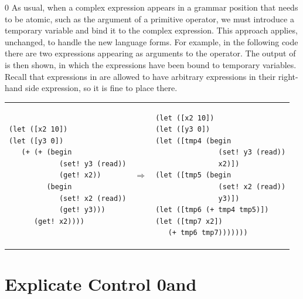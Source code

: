 \documentclass[7x10]{TimesAPriori_MIT}%
\def\racketEd{0}
\providecommand{\BookEdition}{1}
\let\edition\BookEdition
\newcommand{\racket}[1]{{\if\edition\racketEd{#1}\fi}}
\numberwithin{theorem}{chapter}
\numberwithin{definition}{chapter}
\numberwithin{equation}{chapter}
\begin{document}
{\if\edition\racketEd    
%
As usual, when a complex expression appears in a grammar position that
needs to be atomic, such as the argument of a primitive operator, we
must introduce a temporary variable and bind it to the complex
expression.  This approach applies, unchanged, to handle the new
language forms.  For example, in the following code there are two
 expressions appearing as arguments to the \code{+}
operator.  The output of  is then shown, in which the
 expressions have been bound to temporary
variables. Recall that  expressions in \LangLoopANF{} are
allowed to have arbitrary expressions in their right-hand side
expression, so it is fine to place  there.
%
\begin{center}
\begin{tabular}{lcl}
\begin{minipage}{0.4\textwidth}
\begin{lstlisting}
(let ([x2 10])
(let ([y3 0])
   (+ (+ (begin 
            (set! y3 (read))
            (get! x2))
         (begin 
            (set! x2 (read))
            (get! y3)))
      (get! x2))))
\end{lstlisting}
\end{minipage}
&
$\Rightarrow$
&
\begin{minipage}{0.4\textwidth}
\begin{lstlisting}  
(let ([x2 10])
(let ([y3 0])
(let ([tmp4 (begin 
               (set! y3 (read))
               x2)])
(let ([tmp5 (begin 
               (set! x2 (read))
               y3)])
(let ([tmp6 (+ tmp4 tmp5)])
(let ([tmp7 x2])
   (+ tmp6 tmp7)))))))
\end{lstlisting}
\end{minipage}
\end{tabular}
\end{center}

\fi}

\section{Explicate Control \racket{and \LangCLoop{}}}
\label{sec:explicate-loop}

\newcommand{\CloopASTRacket}{
\begin{array}{lcl}
\Atm  &::=&  \VOID \\
\Stmt &::=& \READ{}
\end{array}
}
\end{document}
